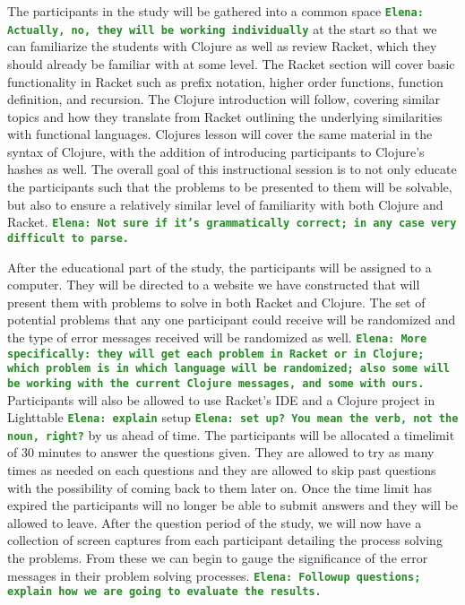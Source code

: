 \documentclass[12pt]{article}
\newcommand{\comment}[1]{{\bf \tt  {#1}}}
\newcommand{\emcomment}[1]{\textcolor{ForestGreen}{\comment{Elena: {#1}}}}
\begin{document}
	The participants in the study will be gathered into a common space \emcomment{Actually, no, they will be working individually} at the start so that we can familiarize the students with Clojure as well as review Racket, which they should already be familiar with at some level. The Racket section will cover basic functionality in Racket such as prefix notation, higher order functions, function definition, and recursion. The Clojure introduction will follow, covering similar topics and how they translate from Racket outlining the underlying similarities with functional languages. Clojures lesson will cover the same material in the syntax of Clojure, with the addition of introducing participants to Clojure's hashes as well. The overall goal of this instructional session is to not only educate the participants such that the problems to be presented to them will be solvable, but also to ensure a relatively similar level of familiarity with both Clojure and Racket. \emcomment{Not sure if it's grammatically correct; in any case very difficult to parse.}

	After the educational part of the study, the participants will be assigned to a computer. They will be directed to a website we have constructed that will present them with problems to solve in both Racket and Clojure. The set of potential problems that any one participant could receive will be randomized and the type of error messages received will be randomized as well. \emcomment{More specifically: they will get each problem in Racket or in Clojure; which problem is in which language will be randomized; also some will be working with the current Clojure messages, and some with ours.}
Participants will also be allowed to use Racket's IDE and a Clojure project in Lighttable \emcomment{explain}  setup \emcomment{set up? You mean the verb, not the noun, right?} by us ahead of time. The participants will be allocated a timelimit of 30 minutes to answer the questions given. They are allowed to try as many times as needed on each questions and they are allowed to skip past questions with the possibility of coming back to them later on. Once the time limit has expired the participants will no longer be able to submit answers and they will be allowed to leave. After the question period of the study, we will now have a collection of screen captures from each participant detailing the process solving the problems. From these we can begin to gauge the significance of the error messages in their problem solving processes. 
\emcomment{Followup questions; explain how we are going to evaluate the results.}
\end{document}
